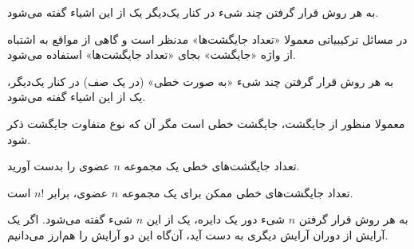 
\begin{DEFINITION}
    \p
    به هر روش قرار گرفتن چند شیء در کنار یک‌دیگر یک 
    از این اشیاء گفته می‌شود.
\end{DEFINITION}

\p
در مسائل ترکیبیاتی معمولا «تعداد جایگشت‌ها» مدنظر است
و گاهی از مواقع به اشتباه از واژه «جایگشت» بجای «تعداد جایگشت‌ها» استفاده می‌شود.

\begin{DEFINITION}
    \p
    به هر روش قرار گرفتن چند شیء «به صورت خطی» (در یک صف) در کنار یک‌دیگر، یک
    از این اشیاء گفته می‌شود.
\end{DEFINITION}

\p
معمولا منظور از جایگشت، جایگشت خطی است مگر آن که نوع متفاوت جایگشت ذکر شود.

\begin{PROBLEM}
    \p
    تعداد جایگشت‌های خطی یک مجموعه $n$ عضوی را بدست آورید.

\end{PROBLEM}

\begin{THEOREM}
    \p
    تعداد جایگشت‌های خطی ممکن برای یک مجموعه $n$
    عضوی، برابر 
    $n!$
    است.
\end{THEOREM}


\begin{DEFINITION}
    \p
    به هر روش قرار گرفتن
    $n$
    شیء دور یک دایره، یک 
    از این
    $n$
    شیء
    گفته می‌شود.
    اگر یک آرایش از دوران آرایش دیگری به دست آید، آن‌گاه این دو آرایش را هم‌ارز می‌دانیم.
\end{DEFINITION}

